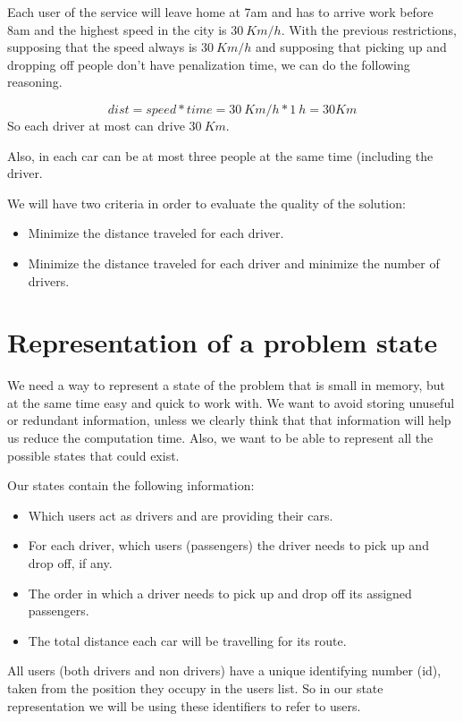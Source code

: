 \documentclass[12]{article}
\begin{document}
Each user of the service will leave home at 7am and has to arrive work before 8am and the highest speed in the city is $30\ Km/h$.
With the previous restrictions, supposing that the speed always is $30\ Km/h$ and supposing that picking up and dropping off people don't have penalization time, we can do the following reasoning.

$$ dist = speed * time = 30\ Km/h * 1\ h = 30 Km $$
So each driver at most can drive $30\ Km$.

Also, in each car can be at most three people at the same time (including the driver.

We will have two criteria in order to evaluate the quality of the solution:
\begin{itemize}
  \item Minimize the distance traveled for each driver.
  \item Minimize the distance traveled for each driver and minimize the number of drivers.
\end{itemize} 
 
\section{Representation of a problem state}
We need a way to represent a state of the problem that is small in memory, but at the same time easy and quick to work with.
We want to avoid storing unuseful or redundant information, unless we clearly think that that information will help us reduce the computation time. Also, we want to be able to represent all the possible states that could exist.

Our states contain the following information:

\begin{itemize}
	\item Which users act as drivers and are providing their cars.
	\item For each driver, which users (passengers) the driver needs to pick up and drop off, if any.
	\item The order in which a driver needs to pick up and drop off its assigned passengers.
	\item The total distance each car will be travelling for its route.
\end{itemize}

All users (both drivers and non drivers) have a unique identifying number (id), taken from the position they occupy in the users list.
So in our state representation we will be using these identifiers to refer to users.
\end{document}
